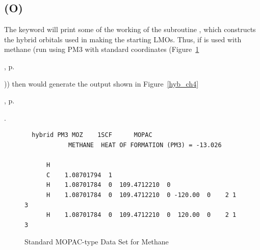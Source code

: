 \subsection*{ (O)}
The keyword  will print some of the working of the
subroutine , which constructs the hybrid orbitals used in
making the starting LMOs.  Thus, if  is used with methane
(run using PM3 with standard coordinates
(Figure~\ref{ch4}
\begin{latexonly}
, p.~\pageref{ch4}
\end{latexonly}))
then  would generate the output shown in
Figure~\ref{hyb_ch4}
\begin{latexonly}
, p.~\pageref{hyb_ch4}
\end{latexonly}.
\begin{figure}
\begin{makeimage}
\end{makeimage}
\begin{verbatim}
  hybrid PM3 MOZ    1SCF      MOPAC
            METHANE  HEAT OF FORMATION (PM3) = -13.026

      H
      C    1.08701794  1
      H    1.08701784  0  109.4712210  0
      H    1.08701784  0  109.4712210  0 -120.00  0    2 1 3
      H    1.08701784  0  109.4712210  0  120.00  0    2 1 3
\end{verbatim}
\caption{\label{ch4}Standard MOPAC-type Data Set for Methane}
\end{figure}
